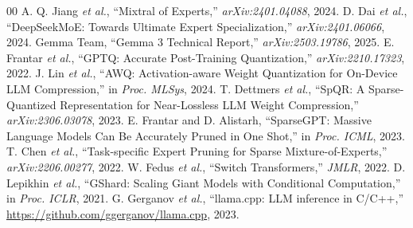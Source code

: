 \documentclass[conference]{IEEEtran}
\begin{document}
\begin{thebibliography}{00}
 A. Q. Jiang \textit{et al.}, ``Mixtral of Experts,'' \textit{arXiv:2401.04088}, 2024.
 D. Dai \textit{et al.}, ``DeepSeekMoE: Towards Ultimate Expert Specialization,'' \textit{arXiv:2401.06066}, 2024.
 Gemma Team, ``Gemma 3 Technical Report,'' \textit{arXiv:2503.19786}, 2025.
 E. Frantar \textit{et al.}, ``GPTQ: Accurate Post-Training Quantization,'' \textit{arXiv:2210.17323}, 2022.
 J. Lin \textit{et al.}, ``AWQ: Activation-aware Weight Quantization for On-Device LLM Compression,'' in \textit{Proc. MLSys}, 2024.
 T. Dettmers \textit{et al.}, ``SpQR: A Sparse-Quantized Representation for Near-Lossless LLM Weight Compression,'' \textit{arXiv:2306.03078}, 2023.
 E. Frantar and D. Alistarh, ``SparseGPT: Massive Language Models Can Be Accurately Pruned in One Shot,'' in \textit{Proc. ICML}, 2023.
 T. Chen \textit{et al.}, ``Task-specific Expert Pruning for Sparse Mixture-of-Experts,'' \textit{arXiv:2206.00277}, 2022.
 W. Fedus \textit{et al.}, ``Switch Transformers,'' \textit{JMLR}, 2022.
 D. Lepikhin \textit{et al.}, ``GShard: Scaling Giant Models with Conditional Computation,'' in \textit{Proc. ICLR}, 2021.
 G. Gerganov \textit{et al.}, ``llama.cpp: LLM inference in C/C++,'' \url{https://github.com/ggerganov/llama.cpp}, 2023.
\end{thebibliography}
\end{document}
